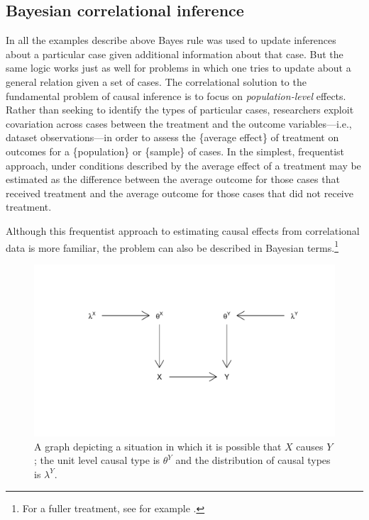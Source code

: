 \documentclass[12pt,]{book}
\let\rmarkdownfootnote\footnote%
\def\footnote{\protect\rmarkdownfootnote}
\begin{document}
\hypertarget{bayesian-correlational-inference}{%
\subsection{Bayesian correlational inference}\label{bayesian-correlational-inference}}

In all the examples describe above Bayes rule was used to update inferences about a particular case given additional information about that case. But the same logic works just as well for problems in which one tries to update about a general relation given a set of cases.
The correlational solution to the fundamental problem of causal inference is to focus on \emph{population-level} effects. Rather than seeking to identify the types of particular cases, researchers exploit covariation across cases between the treatment and the outcome variables---i.e., dataset observations---in order to assess the \{average effect\} of treatment on outcomes for a \{population\} or \{sample\} of cases. In the simplest, frequentist approach, under conditions described by \citep{Rubin1974} the average effect of a treatment may be estimated as the difference between the average outcome for those cases that received treatment and the average outcome for those cases that did not receive treatment.

Although this frequentist approach to estimating causal effects from correlational data is more familiar, the problem can also be described in Bayesian terms.\footnote{For a fuller treatment, see for example \citet{heckman2014treatment}.}

\begin{figure}

{\centering \includegraphics[width=.5\textwidth]{ii_files/figure-latex/simpleXYDAG-1} 

}

\caption{A graph depicting a situation in which it is possible that $X$ causes $Y$; the unit level causal type is $\theta^Y$ and the distribution of causal types is $\lambda^Y$.}\label{fig:simpleXYDAG}
\end{figure}
\end{document}
